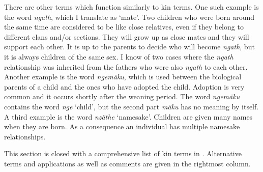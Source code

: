 There are other terms which function similarly to kin terms. One such example is the word \emph{ngath}, which I translate as `mate'. Two children who were born around the same time are considered to be like close relatives, even if they belong to different clans and/or sections. They will grow up as close mates and they will support each other. It is up to the parents to decide who will become \emph{ngath}, but it is always children of the same sex. I know of two cases where the \emph{ngath} relationship was inherited from the fathers who were also \emph{ngath} to each other. Another example is the word \emph{ngemäku}, which is used between the biological parents of a child and the ones who have adopted the child. Adoption is very common and it occurs shortly after the weaning period. The word \emph{ngemäku} contains the word \emph{nge} `child', but the second part \emph{mäku} has no meaning by itself. A third example is the word \emph{nzäthe} `namesake'. Children are given many names when they are born. As a consequence an individual has multiple namesake relationships.

This section is closed with a comprehensive list of kin terms in . Alternative terms and applications as well as comments are given in the rightmost column.

